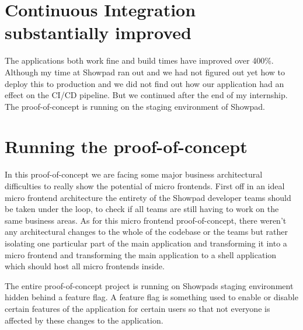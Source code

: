 \section{Continuous Integration substantially improved}
The applications both work fine and build times have improved over 400\%. Although my time at Showpad ran out and we had not figured out yet how to deploy this to production and we did not find out how our application had an effect on the CI/CD pipeline. But we continued after the end of my internship. The proof-of-concept is running on the staging environment of Showpad.
\section{Running the proof-of-concept}
In this proof-of-concept we are facing some major business architectural difficulties to really show the potential of micro frontends. First off in an ideal micro frontend architecture the entirety of the Showpad developer teams should be taken under the loop, to check if all teams are still having to work on the same business areas. As for this micro frontend proof-of-concept, there weren’t any architectural changes to the whole of the codebase or the teams but rather isolating one particular part of the main application and transforming it into a micro frontend and transforming the main application to a shell application which should host all micro frontends inside.

The entire proof-of-concept project is running on Showpads staging environment hidden behind a feature flag. A feature flag is something used to enable or disable certain features of the application for certain users so that not everyone is affected by these changes to the application.


